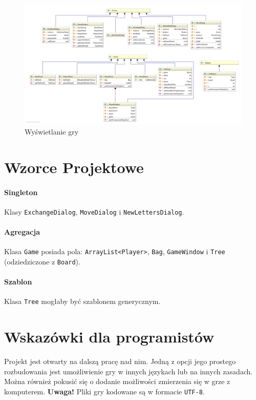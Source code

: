 \documentclass[a4paper]{article}
\begin{document}
\begin{figure}[!hb]
\centering
\includegraphics[width=\textwidth]{swing.png}
\caption{Wyświetlanie gry}
\end{figure}

\newpage
\section{Wzorce Projektowe}
\paragraph{Singleton} Klasy \texttt{ExchangeDialog}, \texttt{MoveDialog} i \texttt{NewLettersDialog}.
\paragraph{Agregacja} Klasa \texttt{Game} posiada pola:
\texttt{ArrayList<Player>}, \texttt{Bag}, \texttt{GameWindow} i \texttt{Tree} (odziedziczone z \texttt{Board}).
\paragraph{Szablon} Klasa \texttt{Tree} mogłaby być szablonem generycznym.

\section{Wskazówki dla programistów}
Projekt jest otwarty na dalszą pracę nad nim. Jedną z opcji jego prostego rozbudowania jest umożliwienie gry w innych językach lub na innych zasadach. Można również pokusić się o dodanie możliwości zmierzenia się w grze z komputerem. \textbf{Uwaga!} Pliki gry kodowane są w formacie \texttt{UTF-8}.
\end{document}
